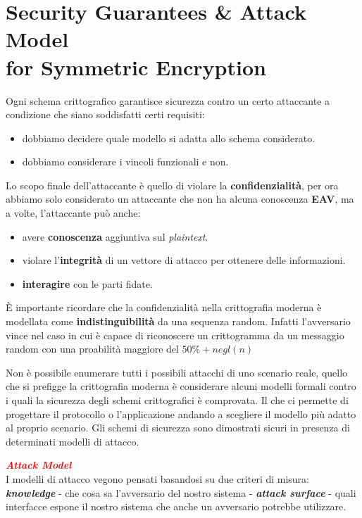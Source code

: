 \chapter{Security Guarantees \& Attack Model \\ \small{for Symmetric Encryption}}

\begin{flushleft}
    Ogni schema crittografico garantisce sicurezza contro un certo attaccante a condizione che siano soddisfatti certi requisiti:
    \begin{itemize}[nosep]
        \item dobbiamo decidere quale modello si adatta allo schema considerato.
        \item dobbiamo considerare i vincoli funzionali e non.
    \end{itemize}

    Lo scopo finale dell'attaccante è quello di violare la \textbf{confidenzialità}, per ora abbiamo solo considerato un attaccante che non ha alcuna conoscenza \textbf{EAV}, ma a volte, l'attaccante può anche:
    \begin{itemize}[nosep]
        \item avere \textbf{conoscenza} aggiuntiva sul \textit{plaintext}.
        \item violare l'\textbf{integrità} di un vettore di attacco per ottenere delle informazioni.
        \item \textbf{interagire} con le parti fidate.
    \end{itemize}

    È importante ricordare che la confidenzialità nella crittografia moderna è modellata come \textbf{indistinguibilità} da una sequenza random. Infatti l'avversario vince nel caso in cui è capace di riconoscere un crittogramma da un messaggio random con una proabilità maggiore del $50\% + negl(n)$

    \smallskip

    Non è possibile enumerare tutti i possibili attacchi di uno scenario reale, quello che si prefigge la crittografia moderna è considerare alcuni modelli formali contro i quali la sicurezza degli schemi crittografici è comprovata. Il che ci permette di progettare il protocollo o l'applicazione andando a scegliere il modello più adatto al proprio scenario. Gli schemi di sicurezza sono dimostrati sicuri in presenza di determinati modelli di attacco.

    \medskip

    \textcolor{red}{\textbf{\textit{Attack Model}}} \\
    I modelli di attacco vegono pensati basandosi su due criteri di misura: \textbf{\textit{knowledge}} - che cosa sa l'avversario del nostro sistema - \textbf{\textit{attack surface}} - quali interfacce espone il nostro sistema che anche un avversario potrebbe utilizzare.


\end{flushleft}
